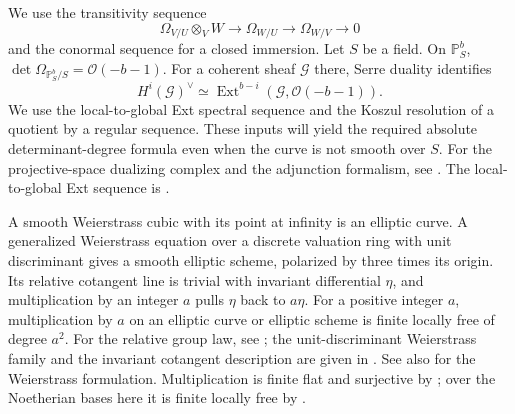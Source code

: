 \begin{foundation}\label{foundation:duality}
We use the transitivity sequence
\[
 \Omega_{V/U}\otimes_VW\longrightarrow\Omega_{W/U}
 \longrightarrow\Omega_{W/V}\longrightarrow0
\]
and the conormal sequence for a closed immersion. Let $S$ be a field. On $\mathbb P^b_S$,
$\det\Omega_{\mathbb P^b_S/S}=\mathcal O(-b-1)$. For a coherent sheaf $\mathcal G$ there, Serre duality identifies
\[
 H^i(\mathcal G)^\vee
 \simeq\operatorname{Ext}^{b-i}
       (\mathcal G,\mathcal O(-b-1)).
\]
We use the local-to-global Ext spectral sequence and the Koszul resolution of a quotient by a regular sequence. These inputs will yield the required absolute determinant-degree formula even when the curve is not smooth over $S$.
For the projective-space dualizing complex and the adjunction formalism, see \cite[Tag 0A9W and Section~48.15]{Stacks}.
The local-to-global Ext sequence is \cite[Tag 0BQP]{Stacks}.
\end{foundation}

\begin{foundation}\label{foundation:elliptic}
A smooth Weierstrass cubic with its point at infinity is an elliptic curve. A generalized Weierstrass equation over a discrete valuation ring with unit discriminant gives a smooth elliptic scheme, polarized by three times its origin. Its relative cotangent line is trivial with invariant differential $\eta$, and multiplication by an integer $a$ pulls $\eta$ back to $a\eta$. For a positive integer $a$, multiplication by $a$ on an elliptic curve or elliptic scheme is finite locally free of degree $a^2$.
For the relative group law, see
\cite[II, Proposition~2.7]{DeligneRapoport1973}; the unit-discriminant
Weierstrass family and the invariant cotangent description are given in
\cite[Tags 072S and 047I]{Stacks}. See also
\cite[Chapter~III]{Silverman2009} for the Weierstrass formulation.
Multiplication is finite flat and surjective by
\cite[Proposition~20.7]{MilneAV2022}; over the Noetherian bases here it
is finite locally free by \cite[Tag 02KB]{Stacks}.
\end{foundation}


